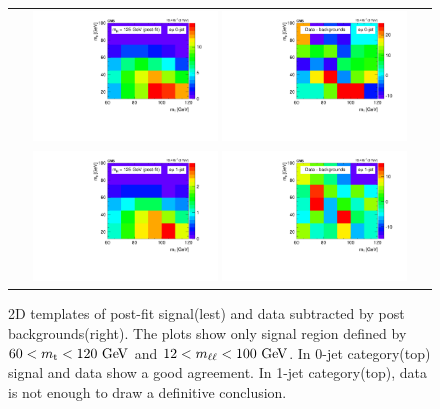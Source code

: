 \begin{figure}[htp] 
\centering 
\begin{tabular}{c} 
\includegraphics[width=0.45\textwidth]{figures/2d_postfit_0j_125_sig_paper.pdf}          
\includegraphics[width=0.45\textwidth]{figures/2d_postfit_0j_125_dataminusbkg_paper.pdf}          
\\
\includegraphics[width=0.45\textwidth]{figures/2d_postfit_1j_125_sig_paper.pdf}          
\includegraphics[width=0.45\textwidth]{figures/2d_postfit_1j_125_dataminusbkg_paper.pdf}          
\end{tabular} 
\caption{2D templates of post-fit signal(lest) and data subtracted by post backgrounds(right). 
The plots show only signal region defined by $60<m_{\mathrm{t}}<120~\mathrm{Ge\kern -0.1em V}$ and $12<m_{\ell\ell}<100~\mathrm{Ge\kern -0.1em V}$.
In 0-jet category(top) signal and data show a good agreement.  
In 1-jet category(top), data is not enough to draw a definitive conclusion. }
\label{fig:post2D} 
\end{figure} 


